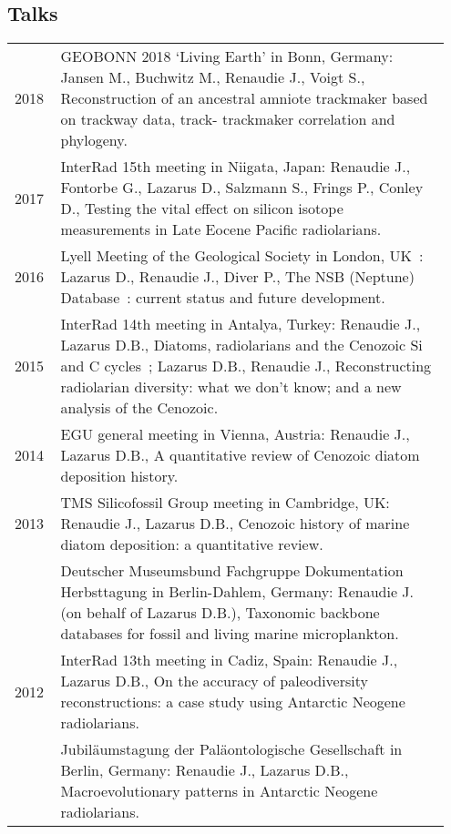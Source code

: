 \documentclass[11pt, a4paper]{article}
\begin{document}
\subsection{Talks}
\begin{longtable}{p{0.1\linewidth} P{0.85\linewidth}}
2018 & GEOBONN 2018 `Living Earth' in Bonn, Germany: Jansen M., Buchwitz M., Renaudie J., Voigt S., Reconstruction of an ancestral amniote trackmaker based on trackway data, track- trackmaker correlation and phylogeny.\\
2017 & InterRad 15th meeting in Niigata, Japan: Renaudie J., Fontorbe G., Lazarus D., Salzmann S., Frings P., Conley D., Testing the vital effect on silicon isotope measurements in Late Eocene Pacific radiolarians.\\
2016 & Lyell Meeting of the Geological Society in London, UK : Lazarus D., Renaudie J., Diver P., The NSB (Neptune) Database : current status and future development.\\
2015 & InterRad 14th meeting in Antalya, Turkey: Renaudie J., Lazarus D.B., Diatoms, radiolarians and the Cenozoic Si and C cycles ; Lazarus D.B., Renaudie J., Reconstructing radiolarian diversity: what we don't know; and a new analysis of the Cenozoic.\\
2014 & EGU general meeting in Vienna, Austria: Renaudie J., Lazarus D.B., A quantitative review of Cenozoic diatom deposition history.\\
2013 & TMS Silicofossil Group meeting in Cambridge, UK: Renaudie J., Lazarus D.B., Cenozoic history of marine diatom deposition: a quantitative review.\\
 & Deutscher Museumsbund Fachgruppe Dokumentation Herbsttagung in Berlin-Dahlem, Germany: Renaudie J. (on behalf of Lazarus D.B.), Taxonomic backbone databases for fossil and living marine microplankton.\\
2012 & InterRad 13th meeting in Cadiz, Spain: Renaudie J., Lazarus D.B., On the accuracy of paleodiversity reconstructions: a case study using Antarctic Neogene radiolarians.\\
 & Jubil\"{a}umstagung der Pal\"{a}ontologische Gesellschaft in Berlin, Germany: Renaudie J., Lazarus D.B., Macroevolutionary patterns in Antarctic Neogene radiolarians.\\

\end{longtable}
\end{document}
